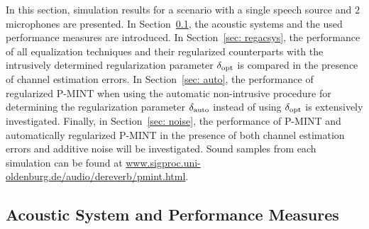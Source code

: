 \documentclass[10pt]{IEEEtran}
\begin{document}
In this section, simulation results for a scenario with a single speech source and $2$ microphones are presented.
In Section~\ref{sec: acsys}, the acoustic systems and the used performance measures are introduced.
In Section~\ref{sec: regacsys}, the performance of all equalization techniques and their regularized counterparts with the intrusively determined regularization parameter $\delta_{\rm opt}$ is compared in the presence of channel estimation errors.
In Section~\ref{sec: auto}, the performance of regularized P-MINT when using the automatic non-intrusive procedure for determining the regularization parameter $\delta_{\rm auto}$ instead of using $\delta_{\rm opt}$ is extensively investigated.
Finally, in Section~\ref{sec: noise}, the performance of P-MINT and automatically regularized P-MINT in the presence of both channel estimation errors and additive noise will be investigated.
Sound samples from each simulation can be found at {\small \url{www.sigproc.uni-oldenburg.de/audio/dereverb/pmint.html}}.

\subsection{Acoustic System and Performance Measures}
\label{sec: acsys}
\end{document}
